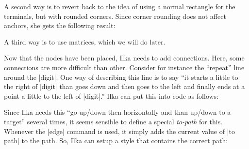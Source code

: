 A second way is to revert back to the idea of using a normal rectangle
for the terminals, but with rounded corners. Since corner rounding
does not affect anchors, she gets the following result:
\begin{codeexample}[]
\end{codeexample}
A third way is to use matrices, which we will do later.

Now that the nodes have been placed, Ilka needs to add
connections. Here, some connections are more difficult than
other. Consider for instance the ``repeat'' line around the
|digit|. One way of describing this line is to say ``it starts a
little to the right of |digit| than goes down and then goes to the
left and finally ends at a point a little to the left of |digit|.''
Ilka can put this into code as follows:
\begin{codeexample}[]
\end{codeexample}

Since Ilka needs this ``go up/down then horizontally and than up/down
to a target'' several times, it seems sensible to define a special
\emph{to-path} for this. Whenever the |edge| command is used, it
simply adds the current value of |to path| to the path. So, Ilka can
setup a style that contains the correct path:
\begin{codeexample}[]
\end{codeexample}

